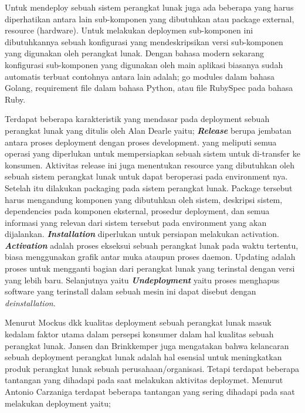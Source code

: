Untuk mendeploy sebuah sistem perangkat lunak juga ada beberapa yang harus diperhatikan antara lain sub-komponen yang dibutuhkan atau package external,
resource (hardware). Untuk melakukan deploymen sub-komponen ini dibutuhkannya sebuah konfigurasi yang mendeskripsikan versi sub-komponen yang digunakan oleh perangkat lunak.
Dengan bahasa modern sekarang konfigurasi sub-komponen yang digunakan oleh main aplikasi biasanya sudah automatis terbuat contohnya antara lain adalah;
go modules\cite{go_mod} dalam bahasa Golang, requirement file\cite{requirementPython} dalam bahasa Python, atau file RubySpec\cite{rubySpec} pada bahasa Ruby.
\par
Terdapat beberapa karakteristik yang mendasar pada deployment sebuah perangkat lunak yang ditulis oleh Alan Dearle yaitu\cite{Dearle2007};
\textbf{\textit{Release}} berupa jembatan antara proses deployment dengan proses development. yang meliputi semua operasi
yang diperlukan untuk mempersiapkan sebuah sistem  untuk di-transfer ke konsumen.
Aktivitas release ini juga menentukan resource yang dibutuhkan oleh sebuah sistem perangkat lunak untuk dapat beroperasi pada environment nya.
Setelah itu dilakukan packaging pada sistem perangkat lunak.
Package tersebut harus mengandung komponen yang dibutuhkan oleh sistem, deskripsi sistem, dependencies pada komponen eksternal, prosedur deployment,
dan semua informasi yang relevan dari sistem tersebut pada environment yang akan dijalankan.
\textbf{\textit{Installation}} diperlukan untuk persiapan melakukan activation. \textbf{\textit{Activation}} adalah proses ekseksui sebuah perangkat lunak pada waktu tertentu, biasa menggunakan grafik antar muka ataupun proses daemon.
Updating adalah proses untuk mengganti bagian dari perangkat lunak yang terinstal dengan versi yang lebih baru.
Selanjutnya yaitu \textbf{\textit{Undeployment}} yaitu proses menghapus software yang terinstall dalam sebuah mesin ini dapat disebut dengan \textit{deinstallation}.
\par
Menurut Mockus dkk\cite{Mockus2005} kualitas deployment sebuah perangkat lunak masuk kedalam faktor utama dalam persepsi konsumer dalam hal kualitas sebuah perangkat lunak.
Jansen dan Brinkkemper\cite{Jansen2006} juga mengatakan bahwa kelancaran sebuah deployment perangkat lunak adalah hal esensial untuk meningkatkan produk perangkat lunak sebuah perusahaan/organisasi.
Tetapi terdapat beberapa tantangan yang dihadapi pada saat melakukan aktivitas deploymet.
Menurut Antonio Carzaniga\cite{Carzaniga1998} terdapat beberapa tantangan yang sering dihadapi pada saat melakukan deployment yaitu;
